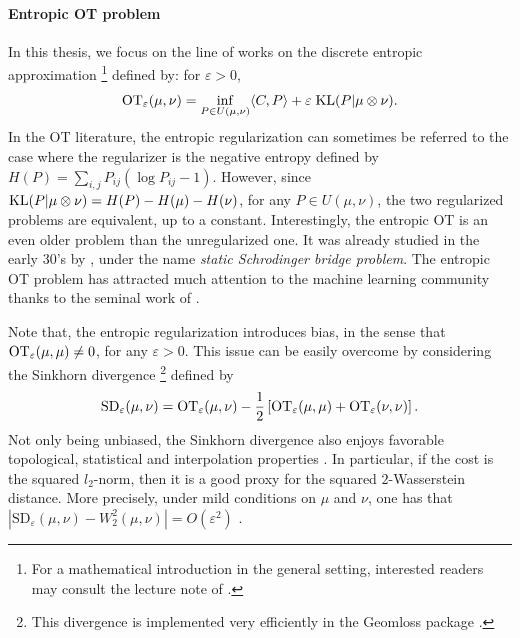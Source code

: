 \paragraph{Entropic OT problem}
In this thesis, we focus on the line of works on the discrete entropic approximation
\footnote{For a mathematical introduction in the general setting,
interested readers may consult the lecture note of \citep{Nutz22}.} defined by:
for $\varepsilon > 0$,
\begin{align}
  \label{eq:primal_ot}
  \text{OT}_{\varepsilon}(\mu, \nu) = \inf_{P \in U(\mu, \nu)} \langle C, P \rangle +
  \varepsilon \; \text{KL}(P | \mu \otimes \nu).
\end{align}
In the OT literature, the entropic regularization can sometimes be referred to the case where
the regularizer is the negative entropy defined by $H(P) = \sum_{i,j} P_{ij} (\log P_{ij} - 1)$.
However, since $\text{KL}(P | \mu \otimes \nu) = H(P) - H(\mu) - H(\nu)$, for any $P \in U(\mu, \nu)$,
the two regularized problems are equivalent, up to a constant.
Interestingly, the entropic OT is an even older problem than the unregularized one.
It was already studied in the early 30's by \citep{Schrodinger32},
under the name \textit{static Schrodinger bridge problem}.
The entropic OT problem has attracted much attention to the
machine learning community thanks to the seminal work of \citep{Cuturi13}.

Note that, the entropic regularization introduces bias,
in the sense that $\text{OT}_{\varepsilon}(\mu, \mu) \neq 0$, for any $\varepsilon > 0$.
This issue can be easily overcome by considering the Sinkhorn divergence
\footnote{This divergence is implemented very efficiently in the Geomloss package \citep{Feydy19}.}
\citep{Ramdas17,Feydy19} defined by
\begin{align}
  \text{SD}_{\varepsilon}(\mu, \nu) = \text{OT}_{\varepsilon}(\mu, \nu)
  - \frac{1}{2} \left[ \text{OT}_{\varepsilon}(\mu, \mu) + \text{OT}_{\varepsilon}(\nu, \nu) \right].
\end{align}
Not only being unbiased, the Sinkhorn divergence also enjoys favorable topological, statistical
and interpolation properties \citep{Feydy19,Genevay19}. In particular,
if the cost is the squared $l_2$-norm, then it is a good proxy
for the squared $2$-Wasserstein distance. More precisely, under mild conditions on $\mu$ and $\nu$,
one has that $| \text{SD}_{\varepsilon}(\mu, \nu) - W_2^2(\mu, \nu) | = O(\varepsilon^2)$
\citep{Chizat20}.

